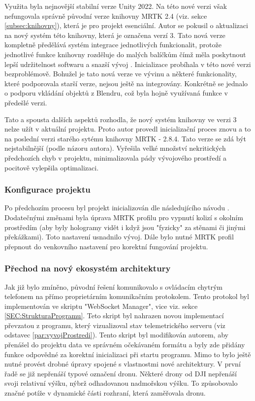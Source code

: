 Využita byla nejnovější stabilní verze Unity 2022. Na této nové verzi však nefungovala správně původní verze knihovny MRTK 2.4 (viz. sekce \ref{subsec:knihovny}), která je pro projekt esenciální. Autor se pokusil o aktualizaci na nový systém této knihovny, která je označena verzí 3.
Tato nová verze kompletně předělává systém integrace jednotlivých funkcionalit, protože jednotlivé funkce knihovny rozděluje do malých balíčkům čímž měla poskytnout lepší udržitelnost softwaru a snazší vývoj \cite{mrtk3}. Inicializace probíhala v této nové verzi bezproblémově. Bohužel je tato nová verze ve vývinu a některé funkcionality, které podporovala starší verze, nejsou ještě na integrovány. Konkrétně se jednalo o podporu vkládání objektů z Blendru, což byla hojně využívaná funkce v předešlé verzi. 

Tato a spousta dalších aspektů rozhodla, že nový systém knihovny ve verzi 3 nelze užít v aktuální projektu. Proto autor provedl inicializační proces znovu a to na poslední verzi starého sytému knihovny MRTK - 2.8.4. Tato verze se zdá být nejstabilnější (podle názoru autora). Vyřešila velké množství nekritických předchozích chyb v projektu, minimalizovala pády vývojového prostředí a pocitově vylepšila optimalizaci. 

\subsubsection{Konfigurace projektu}
Po předchozím procesu byl projekt inicializován dle následujícího návodu \cite{mrtk2TutorialInit}. Dodatečnými změnami byla úprava MRTK profilu pro vypnutí kolizí s okolním prostředím (aby byly hologramy vidět i když jsou "fyzicky" za stěnami či jinými překážkami). Toto nastavení usnadnilo vývoj. Dále bylo nutné MRTK profil přepnout do venkovního nastavení pro korektní fungování projektu.
\subsubsection{Přechod na nový ekosystém architektury}
Jak již bylo zmíněno, původní řešení komunikovalo s ovládacím chytrým telefonem na přímo proprietárním komunikačním protokolem. Tento protokol byl implementován ve skriptu "WebSocket Manager", vice viz. sekce \ref{SEC:StrukturaProgramu}.
Teto skript byl nahrazen novou implementací převzatou z programu, který vizualizoval stav telemetrického serveru (viz odstavec \ref{par:vyvojProstredi}). Tento skript byl modifikován autorem, aby přenášel do projektu data ve správném očekávaném formátu a byly zde přidány funkce odpovědné za korektní inicializaci při startu programu.
Mimo to bylo ještě nutné provést drobné úpravy spojené s vlastnostmi nové architektury. V první řadě se již nepřenáší typové označení dronu. Některé drony od DJI nepřenáší svoji relativní výšku, nýbrž odhadovanou nadmořskou výšku. To způsobovalo značné potíže v dynamické části rozhraní, která zaměřovala dronu. 

